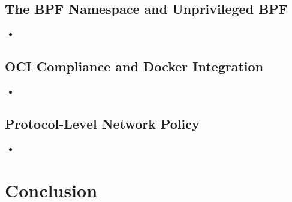 \subsection{The BPF Namespace and Unprivileged BPF}

\begin{inprogress}
  \begin{itemize}
    \item
  \end{itemize}
\end{inprogress}

\subsection{OCI Compliance and Docker Integration}

\begin{inprogress}
  \begin{itemize}
    \item
  \end{itemize}
\end{inprogress}

\subsection{Protocol-Level Network Policy}

\begin{inprogress}
  \begin{itemize}
    \item
  \end{itemize}
\end{inprogress}



\section{Conclusion}
\label{s:disc-conclusion}

